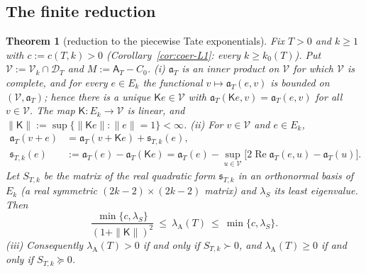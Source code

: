 \documentclass[11pt]{amsart}
\newtheorem{theorem}{Theorem}[section]
\theoremstyle{definition}
\theoremstyle{remark}
\newcommand{\Rel}{\operatorname{Re}}
\newcommand{\lamA}{\lambda_{\mathrm A}(T)}
\newcommand{\Aconst}{\mathsf A_T}
\begin{document}
\subsection{The finite reduction}\label{subsec:coer-schur}

\begin{theorem}[reduction to the piecewise Tate exponentials]\label{thm:coer-schur}
Fix $T>0$ and $k\ge1$ with $c:=c(T,k)>0$ (Corollary~\ref{cor:coer-L1}: every $k\ge k_0(T)$). Put
$\mathcal V:=\mathcal V_k\cap\mathcal D_T$ and $M:=\Aconst-C_0$.
\emph{(i)} $\mathfrak a_T$ is an inner product on $\mathcal V$ for which $\mathcal V$ is complete, and for every
$e\in E_k$ the functional $v\mapsto\mathfrak a_T(e,v)$ is bounded on $(\mathcal V,\mathfrak a_T)$; hence there is a unique
$\mathsf Ke\in\mathcal V$ with $\mathfrak a_T(\mathsf Ke,v)=\mathfrak a_T(e,v)$ for all $v\in\mathcal V$. The map $\mathsf K:E_k\to\mathcal V$ is linear,
and $\|\mathsf K\|:=\sup\{\|\mathsf Ke\|:\|e\|=1\}<\infty$.
\emph{(ii)} For $v\in\mathcal V$ and $e\in E_k$,
\begin{equation}\label{eq:coer-schur}
\begin{split}
\mathfrak a_T(v+e)&=\mathfrak a_T(v+\mathsf Ke)+\mathfrak s_{T,k}(e),\\
\mathfrak s_{T,k}(e)&:=\mathfrak a_T(e)-\mathfrak a_T(\mathsf Ke)=\mathfrak a_T(e)-\sup_{u\in\mathcal V}\big[2\Rel\mathfrak a_T(e,u)-\mathfrak a_T(u)\big].
\end{split}
\end{equation}
Let $S_{T,k}$ be the matrix of the real quadratic form $\mathfrak s_{T,k}$ in an orthonormal basis of $E_k$ (a
real symmetric $(2k-2)\times(2k-2)$ matrix) and $\lambda_S$ its least eigenvalue. Then
\begin{equation}\label{eq:coer-sandwich}
\frac{\min\{c,\lambda_S\}}{(1+\|\mathsf K\|)^2}\ \le\ \lamA\ \le\ \min\{c,\lambda_S\}.
\end{equation}
\emph{(iii)} Consequently $\lamA>0$ if and only if $S_{T,k}\succ0$, and $\lamA\ge0$ if and only if $S_{T,k}\succeq0$.
\end{theorem}
\end{document}
